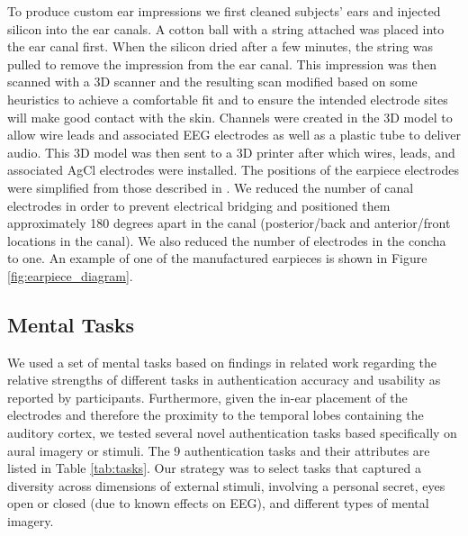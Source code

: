 \documentclass{sigchi}
\begin{document}
To produce custom ear impressions we first cleaned subjects' ears and injected silicon into the ear canals. A cotton ball with a string attached was placed into the ear canal first. When the silicon dried after a few minutes, the string was pulled to remove the impression from the ear canal. This impression was then scanned with a 3D scanner and the resulting scan modified based on some heuristics to achieve a comfortable fit and to ensure the intended electrode sites will make good contact with the skin. Channels were created in the 3D model to allow wire leads and associated EEG electrodes as well as a plastic tube to deliver audio. This 3D model was then sent to a 3D printer after which wires, leads, and associated AgCl electrodes were installed. The positions of the earpiece electrodes were simplified from those described in \cite{Mikkelsen2015}. We reduced the number of canal electrodes in order to prevent electrical bridging and positioned them approximately 180 degrees apart in the canal (posterior/back and anterior/front locations in the canal). We also reduced the number of electrodes in the concha to one. An example of one of the manufactured earpieces is shown in Figure \ref{fig:earpiece_diagram}.

\subsection{Mental Tasks}

We used a set of mental tasks based on findings in related work regarding the relative strengths of different tasks in authentication accuracy and usability as reported by participants. Furthermore, given the in-ear placement of the electrodes and therefore the proximity to the temporal lobes containing the auditory cortex, we tested several novel authentication tasks based specifically on aural imagery or stimuli. The 9 authentication tasks and their attributes are listed in Table \ref{tab:tasks}. Our strategy was to select tasks that captured a diversity across dimensions of external stimuli, involving a personal secret, eyes open or closed (due to known effects on EEG), and different types of mental imagery.
\end{document}
